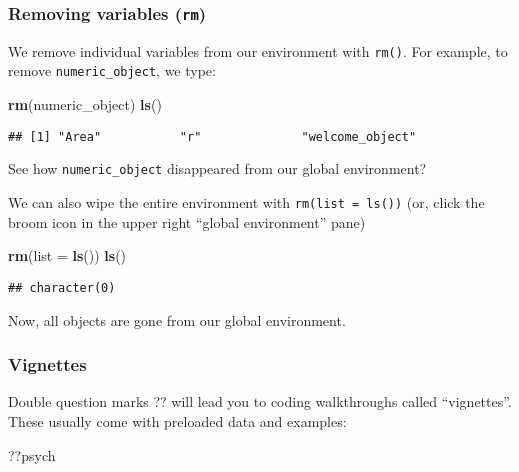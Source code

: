 \documentclass[]{article}
\newenvironment{Shaded}{\begin{snugshade}}{\end{snugshade}}
\newcommand{\KeywordTok}[1]{\textcolor[rgb]{0.13,0.29,0.53}{\textbf{#1}}}
\newcommand{\DataTypeTok}[1]{\textcolor[rgb]{0.13,0.29,0.53}{#1}}
\newcommand{\NormalTok}[1]{#1}
\begin{document}
\subsubsection{\texorpdfstring{Removing variables
(\texttt{rm})}{Removing variables (rm)}}\label{removing-variables-rm}

We remove individual variables from our environment with \texttt{rm()}.
For example, to remove \texttt{numeric\_object}, we type:

\begin{Shaded}
\begin{Highlighting}[]
\KeywordTok{rm}\NormalTok{(numeric_object)}
\KeywordTok{ls}\NormalTok{()}
\end{Highlighting}
\end{Shaded}

\begin{verbatim}
## [1] "Area"           "r"              "welcome_object"
\end{verbatim}

See how \texttt{numeric\_object} disappeared from our global
environment?

We can also wipe the entire environment with \texttt{rm(list\ =\ ls())}
(or, click the broom icon in the upper right ``global environment''
pane)

\begin{Shaded}
\begin{Highlighting}[]
\KeywordTok{rm}\NormalTok{(}\DataTypeTok{list =} \KeywordTok{ls}\NormalTok{()) }
\KeywordTok{ls}\NormalTok{()}
\end{Highlighting}
\end{Shaded}

\begin{verbatim}
## character(0)
\end{verbatim}

Now, all objects are gone from our global environment.

\subsubsection{Vignettes}\label{vignettes}

Double question marks ?? will lead you to coding walkthroughs called
``vignettes''. These usually come with preloaded data and examples:

\begin{Shaded}
\begin{Highlighting}[]
\NormalTok{??psych}
\end{Highlighting}
\end{Shaded}
\end{document}
